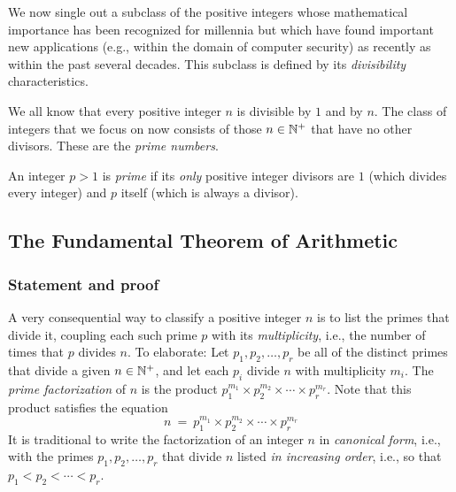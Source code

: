 We now single out a subclass of the positive integers whose mathematical importance has been recognized for millennia but which have found important new applications (e.g., within the domain of computer security) as recently as within the past several decades.  This subclass is defined by its {\em divisibility} characteristics.

\medskip

We all know that every positive integer $n$ is divisible by $1$ and by $n$.  The class of integers that we focus on now consists of those $n \in \mathbb{N}^+$ that have no other divisors.  These are the {\it prime numbers}.

\smallskip

An integer $p >1$ is {\it prime} if its {\em only} positive integer divisors are $1$ (which divides
every integer) and $p$ itself (which is always a divisor).

\bigskip

\noindent {}
  
\subsection{The Fundamental Theorem of Arithmetic}
\label{sec:Fund-Thm-Arith}

\subsubsection{Statement and proof}
\label{sec:FTA-basics}

   

A very consequential way to classify a positive integer $n$ is to list the primes that divide it, coupling each such prime $p$ with its {\it multiplicity}, i.e., the number of times that $p$ divides $n$.  To elaborate: Let $p_1, p_2, \ldots, p_r$ be all of the distinct primes that divide a given $n \in \mathbb{N}^+$, and let each $p_i$ divide $n$ with multiplicity $m_i$.  The {\it prime factorization} of $n$ is the product $p_1^{m_1} \times p_2^{m_2} \times \cdots \times p_r^{m_r}$.  Note that this product satisfies the equation
\begin{equation}
\label{eq:prime-factorization}
n \ = \ p_1^{m_1} \times p_2^{m_2} \times \cdots \times p_r^{m_r}
\end{equation}
It is traditional to write the factorization of an integer $n$ in {\it canonical form}, i.e., with the primes $p_1, p_2, \ldots, p_r$ that divide $n$ listed {\em in increasing order}, i.e., so that $p_1 < p_2 < \cdots < p_r$.

